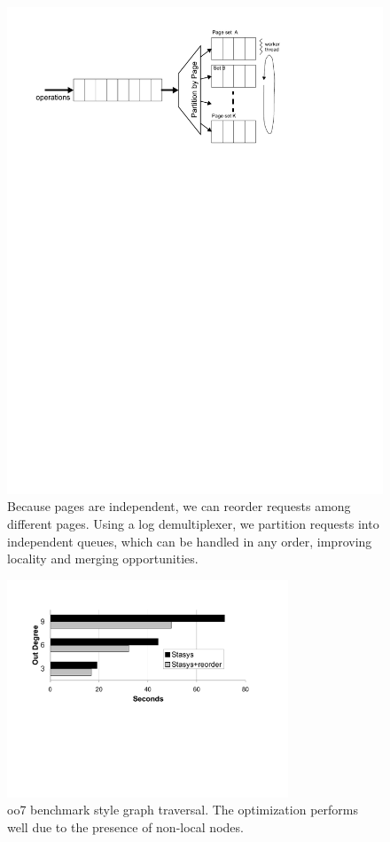 \documentclass[letterpaper,twocolumn,10pt]{article}
\begin{document}
\begin{figure}
\includegraphics[width=1\columnwidth]{figs/graph-traversal.pdf}
\vspace{-24pt}
\caption{\sf\label{fig:multiplexor} Because pages are independent, we
can reorder requests among different pages. Using a log demultiplexer,
we partition requests into independent queues, which can be 
handled in any order, improving locality and merging opportunities.}
\end{figure}
\begin{figure}[t]
\includegraphics[width=3.3in]{figs/oo7.pdf}
\vspace{-15pt}
\caption{\sf\label{fig:oo7} oo7 benchmark style graph traversal.  The optimization performs well due to the presence of non-local nodes.}
\end{figure}
\end{document}
